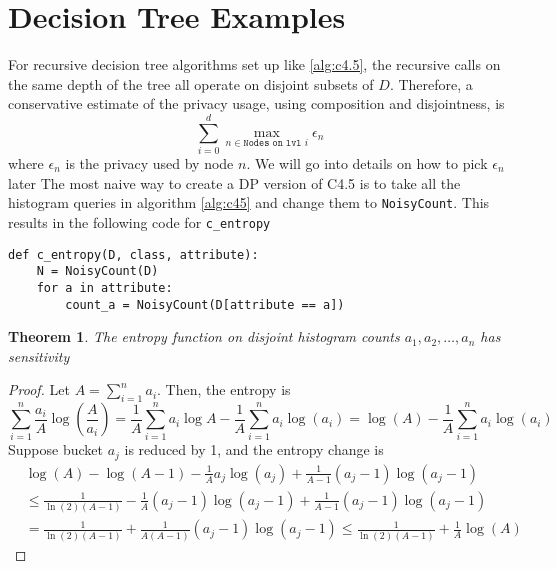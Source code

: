\documentclass[11pt]{article}
\newtheorem{theorem}{Theorem}
\begin{document}
\section{Decision Tree Examples}
For recursive decision tree algorithms set up like \ref{alg:c4.5}, the recursive calls on the same depth of the tree all operate on disjoint subsets of $D$. Therefore, a conservative estimate of the privacy usage, using composition and disjointness, is
\begin{equation}
\sum_{i=0}^d \max_{n \in \texttt{Nodes on lvl }i} \epsilon_{n}
\end{equation}
where $\epsilon_n$ is the privacy used by node $n$. We will go into details on how to pick $\epsilon_n$ later
The most naive way to create a DP version of C4.5 is to take all the histogram queries in algorithm \ref{alg:c45} and change them to \texttt{NoisyCount}. This results in the following code for \texttt{c\_entropy}
\begin{lstlisting}
def c_entropy(D, class, attribute):
    N = NoisyCount(D)
    for a in attribute:
        count_a = NoisyCount(D[attribute == a])
\end{lstlisting}
\begin{theorem}
The entropy function on disjoint histogram counts $a_1,a_2,\ldots, a_n$ has sensitivity
\end{theorem}
\begin{proof}
Let $A = \sum_{i=1}^n a_i$. Then, the entropy is 
\[
\sum_{i=1}^n \frac{a_i}{A}\log\left(\frac{A}{a_i}\right) = \frac{1}{A}\sum_{i=1}^n a_i\log A - \frac{1}{A} \sum_{i=1}^n a_i\log(a_i) = \log(A) - \frac{1}{A}\sum_{i=1}^n a_i\log(a_i)
\]
Suppose bucket $a_j$ is reduced by 1, and the entropy change is
\begin{align*}
&\log(A) - \log(A-1) - \frac{1}{A} a_j\log(a_j) + \frac{1}{A-1} (a_j-1)\log(a_j-1) \\
&\leq \frac{1}{\ln(2)(A-1)} -\frac{1}{A}(a_j-1)\log(a_j-1) + \frac{1}{A-1}(a_j-1)\log(a_j-1) \\
&= \frac{1}{\ln(2)(A-1)}+\frac{1}{A(A-1)}(a_j-1)\log(a_j-1) \leq \frac{1}{\ln(2)(A-1)} + \frac{1}{A}\log(A)
\end{align*}

\end{proof}



\end{document}
